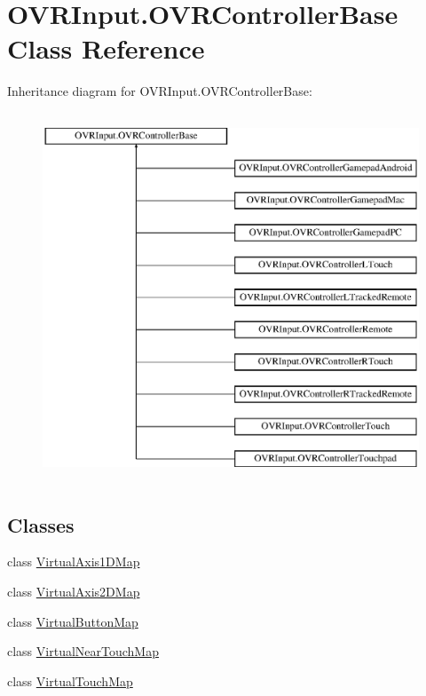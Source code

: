\hypertarget{class_o_v_r_input_1_1_o_v_r_controller_base}{}\section{O\+V\+R\+Input.\+O\+V\+R\+Controller\+Base Class Reference}
\label{class_o_v_r_input_1_1_o_v_r_controller_base}
Inheritance diagram for O\+V\+R\+Input.\+O\+V\+R\+Controller\+Base\+:\begin{figure}[H]
\begin{center}
\leavevmode
\includegraphics[height=11.000000cm]{class_o_v_r_input_1_1_o_v_r_controller_base}
\end{center}
\end{figure}
\subsection*{Classes}
\begin{DoxyCompactItemize}
\item 
class \mbox{\hyperlink{class_o_v_r_input_1_1_o_v_r_controller_base_1_1_virtual_axis1_d_map}{Virtual\+Axis1\+D\+Map}}
\item 
class \mbox{\hyperlink{class_o_v_r_input_1_1_o_v_r_controller_base_1_1_virtual_axis2_d_map}{Virtual\+Axis2\+D\+Map}}
\item 
class \mbox{\hyperlink{class_o_v_r_input_1_1_o_v_r_controller_base_1_1_virtual_button_map}{Virtual\+Button\+Map}}
\item 
class \mbox{\hyperlink{class_o_v_r_input_1_1_o_v_r_controller_base_1_1_virtual_near_touch_map}{Virtual\+Near\+Touch\+Map}}
\item 
class \mbox{\hyperlink{class_o_v_r_input_1_1_o_v_r_controller_base_1_1_virtual_touch_map}{Virtual\+Touch\+Map}}
\end{DoxyCompactItemize}
